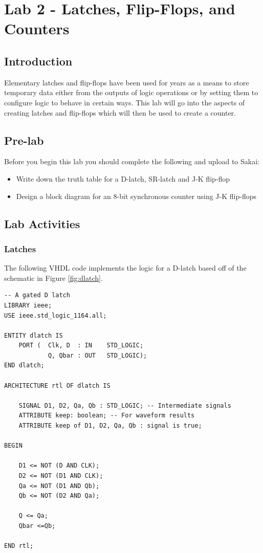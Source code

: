 \section{Lab 2 - Latches, Flip-Flops, and Counters}

\subsection{Introduction}
Elementary latches and flip-flops have been used for years as a means to store temporary data either from the outputs of logic operations or by setting them to configure logic to behave in certain ways. This lab will go into the aspects of creating latches and flip-flops which will then be used to create a counter. 

\subsection{Pre-lab}
Before you begin this lab you should complete the following and upload to Sakai:

\begin{itemize}
	\item Write down the truth table for a D-latch, SR-latch and J-K flip-flop
	\item Design a block diagram for an 8-bit synchronous counter using J-K flip-flops
\end{itemize} 

\subsection{Lab Activities}

\subsubsection{Latches}
The following VHDL code implements the logic for a D-latch based off of the schematic in Figure \ref{fig:dlatch}. 

\begin{lstlisting}
-- A gated D latch
LIBRARY ieee;
USE ieee.std_logic_1164.all;

ENTITY dlatch IS
	PORT (	Clk, D	: IN	STD_LOGIC;
			Q, Qbar	: OUT	STD_LOGIC);
END dlatch;

ARCHITECTURE rtl OF dlatch IS

	SIGNAL D1, D2, Qa, Qb : STD_LOGIC; -- Intermediate signals
	ATTRIBUTE keep: boolean; -- For waveform results
	ATTRIBUTE keep of D1, D2, Qa, Qb : signal is true;
	
BEGIN
	
	D1 <= NOT (D AND CLK);
	D2 <= NOT (D1 AND CLK);
	Qa <= NOT (D1 AND Qb);
	Qb <= NOT (D2 AND Qa);

	Q <= Qa;
	Qbar <=Qb;
	
END rtl;
\end{lstlisting}


